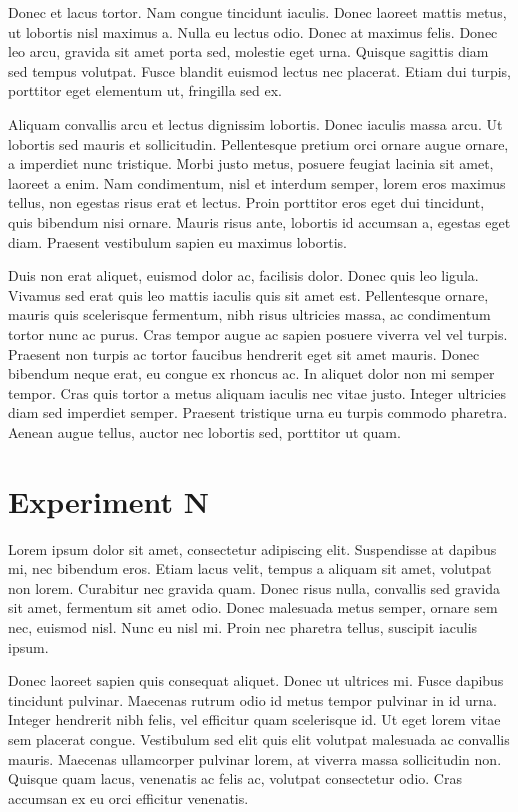 Donec et lacus tortor. Nam congue tincidunt iaculis. Donec laoreet mattis metus, ut lobortis nisl maximus a. Nulla eu lectus odio. Donec at maximus felis. Donec leo arcu, gravida sit amet porta sed, molestie eget urna. Quisque sagittis diam sed tempus volutpat. Fusce blandit euismod lectus nec placerat. Etiam dui turpis, porttitor eget elementum ut, fringilla sed ex.

Aliquam convallis arcu et lectus dignissim lobortis. Donec iaculis massa arcu. Ut lobortis sed mauris et sollicitudin. Pellentesque pretium orci ornare augue ornare, a imperdiet nunc tristique. Morbi justo metus, posuere feugiat lacinia sit amet, laoreet a enim. Nam condimentum, nisl et interdum semper, lorem eros maximus tellus, non egestas risus erat et lectus. Proin porttitor eros eget dui tincidunt, quis bibendum nisi ornare. Mauris risus ante, lobortis id accumsan a, egestas eget diam. Praesent vestibulum sapien eu maximus lobortis.

Duis non erat aliquet, euismod dolor ac, facilisis dolor. Donec quis leo ligula. Vivamus sed erat quis leo mattis iaculis quis sit amet est. Pellentesque ornare, mauris quis scelerisque fermentum, nibh risus ultricies massa, ac condimentum tortor nunc ac purus. Cras tempor augue ac sapien posuere viverra vel vel turpis. Praesent non turpis ac tortor faucibus hendrerit eget sit amet mauris. Donec bibendum neque erat, eu congue ex rhoncus ac. In aliquet dolor non mi semper tempor. Cras quis tortor a metus aliquam iaculis nec vitae justo. Integer ultricies diam sed imperdiet semper. Praesent tristique urna eu turpis commodo pharetra. Aenean augue tellus, auctor nec lobortis sed, porttitor ut quam.

\section{Experiment N}
Lorem ipsum dolor sit amet, consectetur adipiscing elit. Suspendisse at dapibus mi, nec bibendum eros. Etiam lacus velit, tempus a aliquam sit amet, volutpat non lorem. Curabitur nec gravida quam. Donec risus nulla, convallis sed gravida sit amet, fermentum sit amet odio. Donec malesuada metus semper, ornare sem nec, euismod nisl. Nunc eu nisl mi. Proin nec pharetra tellus, suscipit iaculis ipsum.

Donec laoreet sapien quis consequat aliquet. Donec ut ultrices mi. Fusce dapibus tincidunt pulvinar. Maecenas rutrum odio id metus tempor pulvinar in id urna. Integer hendrerit nibh felis, vel efficitur quam scelerisque id. Ut eget lorem vitae sem placerat congue. Vestibulum sed elit quis elit volutpat malesuada ac convallis mauris. Maecenas ullamcorper pulvinar lorem, at viverra massa sollicitudin non. Quisque quam lacus, venenatis ac felis ac, volutpat consectetur odio. Cras accumsan ex eu orci efficitur venenatis.

